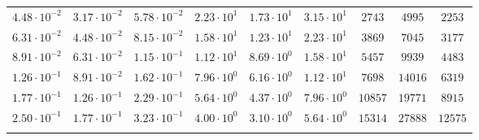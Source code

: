 \documentclass[draft,linenumbers]{agujournal2018}
\begin{document}
\begin{table}
\begin{tabular}{c c c c c c c c c}
$4.48\cdot 10^{-2}$ & $3.17\cdot 10^{-2}$ & $5.78\cdot 10^{-2}$ & $2.23\cdot 10^{1}$ & $1.73\cdot 10^{1}$ & $3.15\cdot 10^{1}$ & $      2743$ & $      4995$ & $   2253$\\
$6.31\cdot 10^{-2}$ & $4.48\cdot 10^{-2}$ & $8.15\cdot 10^{-2}$ & $1.58\cdot 10^{1}$ & $1.23\cdot 10^{1}$ & $2.23\cdot 10^{1}$ & $      3869$ & $      7045$ & $   3177$\\
$8.91\cdot 10^{-2}$ & $6.31\cdot 10^{-2}$ & $1.15\cdot 10^{-1}$ & $1.12\cdot 10^{1}$ & $8.69\cdot 10^{0}$ & $1.58\cdot 10^{1}$ & $      5457$ & $      9939$ & $   4483$\\
$1.26\cdot 10^{-1}$ & $8.91\cdot 10^{-2}$ & $1.62\cdot 10^{-1}$ & $7.96\cdot 10^{0}$ & $6.16\cdot 10^{0}$ & $1.12\cdot 10^{1}$ & $      7698$ & $     14016$ & $   6319$\\
$1.77\cdot 10^{-1}$ & $1.26\cdot 10^{-1}$ & $2.29\cdot 10^{-1}$ & $5.64\cdot 10^{0}$ & $4.37\cdot 10^{0}$ & $7.96\cdot 10^{0}$ & $     10857$ & $     19771$ & $   8915$\\
$2.50\cdot 10^{-1}$ & $1.77\cdot 10^{-1}$ & $3.23\cdot 10^{-1}$ & $4.00\cdot 10^{0}$ & $3.10\cdot 10^{0}$ & $5.64\cdot 10^{0}$ & $     15314$ & $     27888$ & $  12575$\\
\hline \\
\end{tabular}
\label{table:evalfreqs1d}
\end{table}

\clearpage
\end{document}
